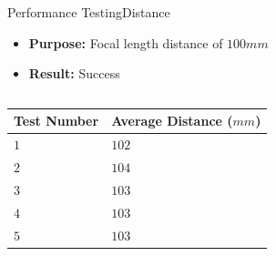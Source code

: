 \begin{frame}{Performance Testing}{Distance}
\begin{itemize}
    \item \textbf{Purpose:} Focal length distance of $100 mm$
    \item \textbf{Result:} Success
\end{itemize}
\vspace{5pt}
\begin{columns}
\begin{table}[!h]
    \centering
\begin{tabular}{m{1.5cm} m{1.7cm}}
    \hline
    \rowcolor{beamer@barcolor} 
    Test Number & Average Distance ($mm$) \\
    \hline
    $1$ & $102$  \\
    \rowcolor{beamer@barcolor} $2$ & $104$ \\
    $3$ & $103$ \\
    \rowcolor{beamer@barcolor} $4$ & $103$ \\
    $5$ & $103$ \\
    \hline
\end{tabular}
\end{table}
\end{columns}
\end{frame}

